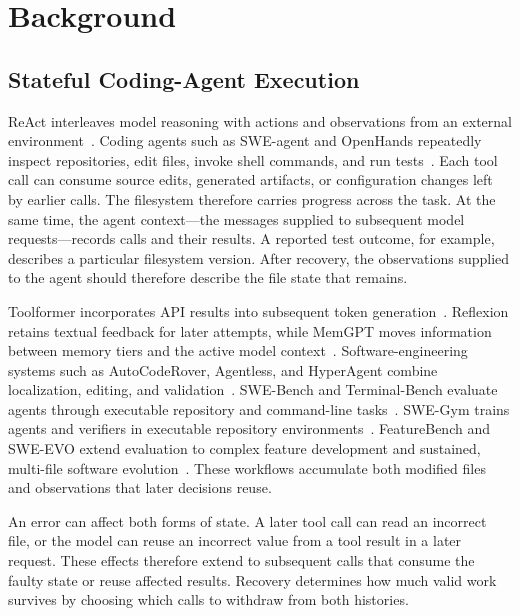 \section{Background}
\label{sec:background}

\subsection{Stateful Coding-Agent Execution}

ReAct interleaves model reasoning with actions and observations from an
external environment~\cite{react}. Coding agents such as SWE-agent and
OpenHands repeatedly inspect repositories,
edit files, invoke shell commands, and run tests~\cite{sweagent,openhands}.
Each tool call can consume source edits, generated artifacts, or configuration
changes left by earlier calls. The filesystem therefore carries
progress across the task. At the same time, the agent context---the messages
supplied to subsequent model requests---records calls and their results.
A reported test outcome, for example, describes a particular filesystem
version. After recovery, the observations supplied to the agent should
therefore describe the file state that remains.

Toolformer incorporates API results into subsequent token
generation~\cite{toolformer}. Reflexion retains textual feedback for later
attempts, while MemGPT moves information between memory tiers and the
active model context~\cite{reflexion,memgpt}. Software-engineering systems such as
AutoCodeRover, Agentless, and HyperAgent combine localization, editing, and
validation~\cite{autocoderover,agentless,hyperagent}.
SWE-Bench and Terminal-Bench evaluate agents through executable repository
and command-line tasks~\cite{swebench,tbench}.
SWE-Gym trains agents and verifiers in executable repository
environments~\cite{swegym}. FeatureBench and SWE-EVO extend evaluation to
complex feature development and sustained, multi-file software
evolution~\cite{featurebench,sweevo}. These workflows accumulate both modified
files and observations that later decisions reuse.

An error can affect both forms of state. A later tool call can read an incorrect
file, or the model can reuse an incorrect value from a tool result in a later
request. These effects therefore extend to subsequent calls that
consume the faulty state or reuse affected results. Recovery determines how
much valid work survives by choosing which calls to withdraw from both
histories.

